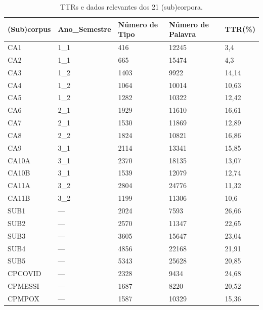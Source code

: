 \documentclass[portuguese]{textolivre}
\begin{document}
\begin{table}[h]
\centering
\small
\begin{threeparttable}
\caption{TTRs e dados relevantes dos 21 (sub)corpora.}
\label{tab4}
\begin{tabular}{lllll}
\toprule
(Sub)corpus & Ano\_Semestre & Número de Tipo & Número de Palavra & TTR(\%) \\
\midrule
CA1         & 1\_1          & 416            & 12245             & 3,4     \\ 
CA2         & 1\_1          & 665            & 15474             & 4,3     \\ 
CA3         & 1\_2          & 1403           & 9922              & 14,14   \\ 
CA4         & 1\_2          & 1064           & 10014             & 10,63   \\ 
CA5         & 1\_2          & 1282           & 10322             & 12,42   \\ 
CA6         & 2\_1          & 1929           & 11610             & 16,61   \\ 
CA7         & 2\_1          & 1530           & 11869             & 12,89   \\ 
CA8         & 2\_2          & 1824           & 10821             & 16,86   \\ 
CA9         & 3\_1          & 2114           & 13341             & 15,85   \\ 
CA10A       & 3\_1          & 2370           & 18135             & 13,07   \\ 
CA10B       & 3\_1          & 1539           & 12079             & 12,74   \\ 
CA11A       & 3\_2          & 2804           & 24776             & 11,32   \\ 
CA11B       & 3\_2          & 1199           & 11306             & 10,6    \\ 
SUB1        & —             & 2024           & 7593              & 26,66   \\ 
SUB2        & —             & 2570           & 11347             & 22,65   \\ 
SUB3        & —             & 3605           & 15647             & 23,04   \\ 
SUB4        & —             & 4856           & 22168             & 21,91   \\ 
SUB5        & —             & 5343           & 25628             & 20,85   \\ 
CPCOVID     & —             & 2328           & 9434              & 24,68   \\ 
CPMESSI     & —             & 1687           & 8220              & 20,52   \\ 
CPMPOX      & —             & 1587           & 10329             & 15,36   \\   
\bottomrule
\end{tabular}%
\end{threeparttable}
\end{table}
\end{document}
